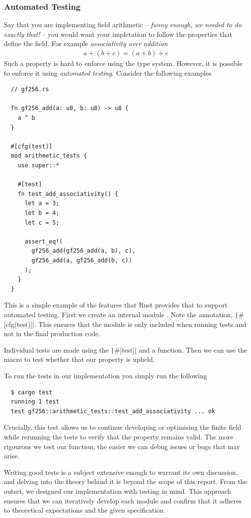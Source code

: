\documentclass[11pt]{report}
\theoremstyle{definition}
\theoremstyle{plain}
\begin{document}
\subsubsection{Automated Testing}
Say that you are implementing field arithmetic -- \textit{funny enough, we needed to do exactly that!} -- you would want your impletation to follow the properties that define the field. For example \textit{associativity over addition}
\begin{align}
  a + (b + c) = (a + b) + c
\end{align}
Such a property is hard to enforce using the type system. However, it is possible to enforce it using \textit{automated testing}. Consider the following examples
\begin{verbatim}
  // gf256.rs

  fn gf256_add(a: u8, b: u8) -> u8 {
    a ^ b
  }

  #[cfg(test)]
  mod arithmetic_tests {
    use super::*
    
    #[test]
    fn test_add_associativity() {
      let a = 3;
      let b = 4;
      let c = 5;

      assert_eq!(
        gf256_add(gf256_add(a, b), c), 
        gf256_add(a, gf256_add(b, c))
      );
    }
  }
\end{verbatim}
This is a simple example of the features that Rust provides that to support automated testing. First we create an internal module . Note the annotation, \texttt|#[cfg(test)]|. This ensures that the module is only included when running tests and not in the final production code.

Individual tests are made using the \texttt|#[test]| and a function. Then we can use the macro  to test whether that our property is upheld.

To run the tests in our implementation you simply run the following
\begin{verbatim}
  $ cargo test
  running 1 test
  test gf256::arithmetic_tests::test_add_associativity ... ok
\end{verbatim}
Crucially, this test allows us to continue developing or optimising the finite field while rerunning the tests to verify that the property remains valid. The more rigourous we test our function, the easier we can debug issues or bugs that may arise.

Writing good tests is a subject extensive enough to warrant its own discussion, and delving into the theory behind it is beyond the scope of this report. From the outset, we designed our implementation with testing in mind. This approach ensures that we can iteratively develop each module and confirm that it adheres to theoretical expectations and the given specification.
\end{document}

